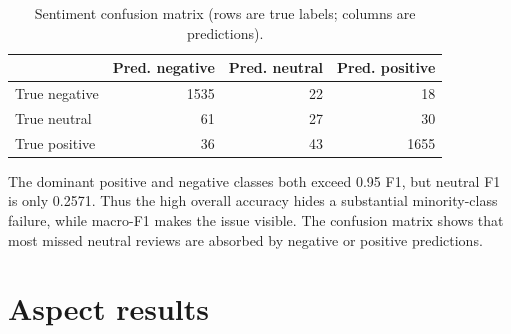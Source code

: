\documentclass[11pt,a4paper]{report}
\begin{document}
\begin{table}[H]
\centering
\caption{Sentiment confusion matrix (rows are true labels; columns are predictions).}
\label{tab:sentiment-confusion}
\begin{tabular}{lrrr}
\toprule
 & Pred. negative & Pred. neutral & Pred. positive \\
\midrule
True negative & \cellcolor{PaletteGreen}1535 & \cellcolor{PaletteYellow}22 & \cellcolor{PaletteYellow}18 \\
True neutral  & \cellcolor{PaletteRed}61 & \cellcolor{PaletteOrange}27 & \cellcolor{PaletteRed}30 \\
True positive & \cellcolor{PaletteYellow}36 & \cellcolor{PaletteRed}43 & \cellcolor{PaletteGreen}1655 \\
\bottomrule
\end{tabular}
\end{table}

The dominant positive and negative classes both exceed 0.95 F1, but neutral F1 is only 0.2571.  Thus the high overall accuracy hides a substantial minority-class failure, while macro-F1 makes the issue visible.  The confusion matrix shows that most missed neutral reviews are absorbed by negative or positive predictions.

\section{Aspect results}
\end{document}
